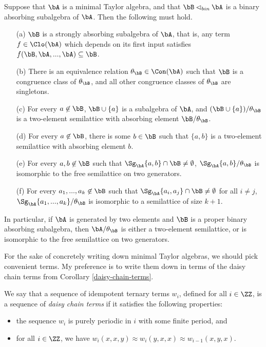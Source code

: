 \begin{prop}\label{prop-minimal-binary-strong} Suppose that $\bA$ is a minimal Taylor algebra, and that $\bB \lhd_{bin} \bA$ is a binary absorbing subalgebra of $\bA$. Then the following must hold.
\begin{itemize}
\item[(a)] $\bB$ is a strongly absorbing subalgebra of $\bA$, that is, any term $f \in \Clo(\bA)$ which depends on its first input satisfies $f(\bB, \bA, ..., \bA) \subseteq \bB$.
\item[(b)] There is an equivalence relation $\theta_\bB \in \Con(\bA)$ such that $\bB$ is a congruence class of $\theta_\bB$, and all other congruence classes of $\theta_\bB$ are singletons.
\item[(c)] For every $a \not\in \bB$, $\bB \cup \{a\}$ is a subalgebra of $\bA$, and $(\bB \cup \{a\})/\theta_\bB$ is a two-element semilattice with absorbing element $\bB/\theta_\bB$.
\item[(d)] For every $a \not\in \bB$, there is some $b \in \bB$ such that $\{a,b\}$ is a two-element semilattice with absorbing element $b$.
\item[(e)] For every $a,b \not\in \bB$ such that $\Sg_\bA\{a,b\} \cap \bB \ne \emptyset$, $\Sg_{\bA}\{a,b\}/\theta_\bB$ is isomorphic to the free semilattice on two generators.
\item[(f)] For every $a_1, ..., a_k \not\in \bB$ such that $\Sg_\bA\{a_i,a_j\} \cap \bB \ne \emptyset$ for all $i \ne j$, $\Sg_{\bA}\{a_1, ..., a_k\}/\theta_\bB$ is isomorphic to a semilattice of size $k+1$.
\end{itemize}
In particular, if $\bA$ is generated by two elements and $\bB$ is a proper binary absorbing subalgebra, then $\bA/\theta_\bB$ is either a two-element semilattice, or is isomorphic to the free semilattice on two generators.
\end{prop}

For the sake of concretely writing down minimal Taylor algebras, we should pick convenient terms. My preference is to write them down in terms of the daisy chain terms from Corollary \ref{daisy-chain-terms}.

\begin{defn} We say that a sequence of idempotent ternary terms $w_i$, defined for all $i \in \ZZ$, is a sequence of \emph{daisy chain terms} if it satisfies the following properties:
\begin{itemize}
\item the sequence $w_i$ is purely periodic in $i$ with some finite period, and
\item for all $i \in \ZZ$, we have $w_i(x,x,y) \approx w_i(y,x,x) \approx w_{i-1}(x,y,x)$.
\end{itemize}
\end{defn}


